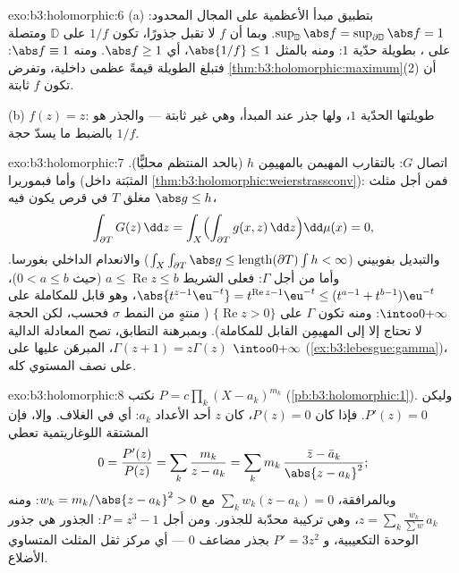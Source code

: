 \begin{solution}{exo:b3:holomorphic:6}
(a) بتطبيق مبدأ الأعظمية على المجال المحدود: $\sup_{\mathbb D}\abs f = \sup_{\partial\mathbb D}\abs f = 1$. وبما أن
$f$ لا تقبل جذورًا، تكون $1/f$  على $\mathbb D$ ومتصلة
على ، بطويلة حدّية $1$: ومنه بالمثل $\abs{1/f} \leq 1$، أي
$\abs f \geq 1$. ومنه $\abs f \equiv
1$: فتبلغ الطويلة قيمةً عظمى داخلية،
وتفرض \cref{thm:b3:holomorphic:maximum}(2) أن تكون $f$ ثابتة.

(b) $f(z) = z$: طويلتها الحدّية $1$، ولها جذر عند المبدأ، وهي
غير ثابتة --- والجذر هو بالضبط ما يسدّ حجة $1/f$.
\end{solution}

\begin{solution}{exo:b3:holomorphic:7}
اتصال $G$: بالتقارب المهيمن بالمهيمِن $h$ (بالحد المنتظم
محليًّا). وأما  فبموريرا (المثبَتة داخل
\cref{thm:b3:holomorphic:weierstrassconv}): فمن أجل مثلث مغلق $T$ في قرص يكون فيه
$\abs g \leq h$،
\[
\int_{\partial T}G(z)\,\dd z =
\int_X\Bigl(\int_{\partial T}g(x, z)\,\dd z\Bigr)\dd\mu(x) =
0,
\]
والتبديل بفوبيني ($\int_X\int_{\partial T}\abs
g \leq \operatorname{length}(\partial T)\int h < \infty$) والانعدام الداخلي بغورسا. وأما من أجل
$\Gamma$: فعلى الشريط $a
\leq \operatorname{Re}z \leq b$ (حيث $0 < a \leq b$)، $\abs{t^{z-1}\eu^{-t}} = t^{\operatorname{Re}z-1}\eu^{-t} \leq
(t^{a-1} + t^{b-1})\eu^{-t}$، وهو
قابل للمكاملة على $\intoo0{+\infty}$: ومنه تكون $\Gamma$  على
$\{\operatorname{Re} z > 0\}$ ( منتهٍ من النمط $\sigma$ فحسب، لكن الحجة لا
تحتاج إلا إلى المهيمِن القابل للمكاملة). وبمبرهنة التطابق، تصح
المعادلة الدالية $\Gamma(z + 1) = z\Gamma(z)$، المبرهَن عليها على $\intoo0{+\infty}$ (\cref{ex:b3:lebesgue:gamma})،
على نصف المستوي كله.
\end{solution}

\begin{solution}{exo:b3:holomorphic:8}
نكتب $P = c\prod_k(X - a_k)^{m_k}$ (\cref{pb:b3:holomorphic:1}). وليكن $P'(z) = 0$. فإذا كان $P(z) = 0$،
كان $z$ أحد الأعداد $a_k$: أي في الغلاف. وإلا، فإن المشتقة
اللوغاريتمية تعطي
\[
0 = \frac{P'(z)}{P(z)} = \sum_k\frac{m_k}{z - a_k}
= \sum_k m_k\,\frac{\bar z - \bar a_k}{\abs{z - a_k}^2} ;
\]
وبالمرافقة، $\sum_kw_k(z - a_k) = 0$ مع $w_k = m_k/\abs{z -
a_k}^2 > 0$: ومنه $z = \sum_k\frac{w_k}{\sum w}\,a_k$، وهي تركيبة محدّبة
للجذور. ومن أجل $P = z^3 - 1$: الجذور هي جذور الوحدة التكعيبية،
و $P' = 3z^2$ بجذر مضاعف $0$ --- أي مركز ثقل المثلث المتساوي
الأضلاع.
\end{solution}

